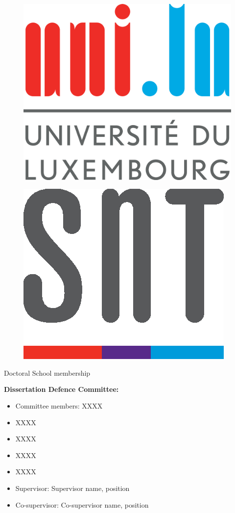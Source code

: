 \documentclass[11pt,a4paper]{report}
\begin{document}
\begin{figure}
\includegraphics[width=0.3\columnwidth]{./Figures/logo_uni.eps}
\centering
\end{figure}

\begin{figure}
\includegraphics[width=0.3\columnwidth]{./Figures/logo_SnT.eps}
\centering
\end{figure}
\vfill
\begin{center}
Doctoral School membership\\
\end{center}


\vfill
\noindent \textbf{Dissertation Defence Committee:}
\vspace{0.2cm}
\begin{itemize}[leftmargin=0cm]
\item[] Committee members: \hspace{2cm} XXXX
	\item[] \hspace{5.8cm} XXXX
	\item[] \hspace{5.8cm} XXXX
	\item[] \hspace{5.8cm} XXXX
	\item[] \hspace{5.8cm} XXXX
\end{itemize}
\begin{itemize}[leftmargin=0cm]
	\item[] Supervisor: \hspace{3.6cm} Supervisor name, position
\end{itemize}
\begin{itemize}[leftmargin=0cm]
	\item[] Co-supervisor: \hspace{3.1cm} Co-supervisor name, position
\end{itemize}
\end{document}
